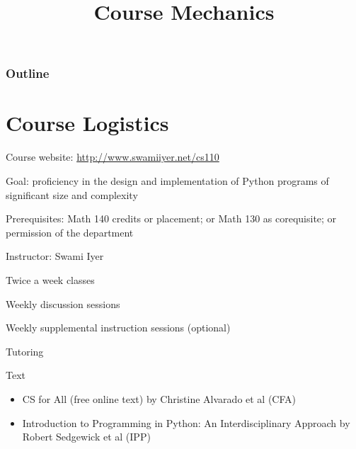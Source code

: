 \documentclass[8pt,a4paper,compress]{beamer}
\title{Course Mechanics}
\date{}
\begin{document}
\begin{frame}
\vfill
\titlepage
\end{frame}

\begin{frame}
\frametitle{Outline}
\tableofcontents
\end{frame}

\section{Course Logistics}
\begin{frame}[fragile]
\pause

Course website: \href{http://www.swamiiyer.net/cs110}{http://www.swamiiyer.net/cs110}

\pause
\bigskip

Goal: proficiency in the design and implementation of Python programs of significant size and complexity

\pause
\bigskip

Prerequisites: Math 140 credits or placement; or Math 130 as corequisite; or permission of the department

\pause
\bigskip

Instructor: Swami Iyer

\pause
\bigskip

Twice a week classes

\pause
\bigskip

Weekly discussion sessions

\pause
\bigskip

Weekly supplemental instruction sessions (optional)

\pause
\bigskip

Tutoring

\pause
\bigskip

Text
\begin{itemize}
\item CS for All (free online text) by Christine Alvarado et al (CFA)
\item Introduction to Programming in Python: An Interdisciplinary Approach by Robert Sedgewick et al (IPP)
\end{itemize}
\end{frame}
\end{document}
